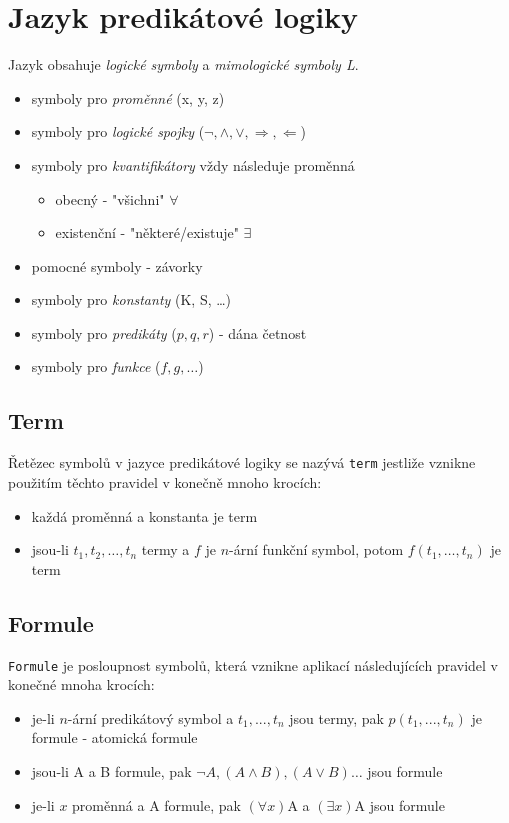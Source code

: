 \documentclass{szzclass}
\begin{document}
\tableofcontents
\newpage

\section{Jazyk predikátové logiky}
Jazyk obsahuje \textit{logické symboly} a \textit{mimologické symboly L}.
\begin{itemize}
  \item symboly pro \textit{proměnné} (x, y, z)
  \item symboly pro \textit{logické spojky} ($\neg, \wedge, \vee, \Rightarrow, \Leftarrow$)
  \item symboly pro \textit{kvantifikátory} vždy následuje proměnná
  \begin{itemize}
    \item obecný - "všichni" $\forall$
    \item existenční - "některé/existuje" $\exists$
  \end{itemize}
  \item pomocné symboly - závorky
  \item symboly pro \textit{konstanty} (K, S, \dots)
  \item symboly pro \textit{predikáty} ($p, q, r$) - dána četnost
  \item symboly pro \textit{funkce} ($f, g, \dots$)
\end{itemize}
\subsection{Term}
Řetězec symbolů v jazyce predikátové logiky se nazývá \texttt{term} jestliže vznikne použitím těchto pravidel v konečně mnoho krocích:
\begin{itemize}
  \item každá proměnná a konstanta je term
  \item jsou-li $t_1, t_2,\dots,t_n$ termy a $f$ je $n$-ární funkční symbol, potom $f(t_1,\dots,t_n)$ je term
\end{itemize}
\subsection{Formule}
\texttt{Formule} je posloupnost symbolů, která vznikne aplikací následujících pravidel v konečné mnoha krocích:
\begin{itemize}
  \item je-li $n$-ární predikátový symbol a $t_1,...,t_n$ jsou termy, pak $p(t_1,...,t_n)$ je formule - atomická formule
  \item jsou-li A a B formule, pak $\neg A, (A \wedge B), (A \vee B)\dots$ jsou formule
  \item je-li $x$ proměnná a A formule, pak $(\forall{x})$A a $(\exists{x})$A jsou formule
\end{itemize}
\end{document}

